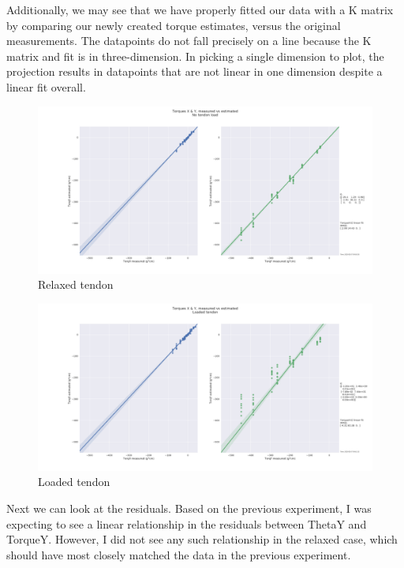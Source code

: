 \documentclass[12pt]{article}
\begin{document}
Additionally, we may see that we have properly fitted our data with a K matrix by comparing our
newly created torque estimates, versus the original measurements. The datapoints do not fall
precisely on a line because the K matrix and fit is in three-dimension. In picking a single
dimension to plot, the projection results in datapoints that are not linear in one dimension despite
a linear fit overall.

\begin{figure}[H]
\centering
\includegraphics[width=.9\textwidth]{images/stiff/GOODtorqsanity.png}
\caption{Relaxed tendon}
\end{figure}

\begin{figure}[H]
\centering
\includegraphics[width=.9\textwidth]{images/stiff/GOODtorqsanity_loaded.png}
\caption{Loaded tendon}
\end{figure}



Next we can look at the residuals. Based on the previous experiment, I was expecting to see a linear
relationship in the residuals between ThetaY and TorqueY. However, I did not see any such
relationship in the relaxed case, which should have most closely matched the data in the previous
experiment. 
\end{document}
